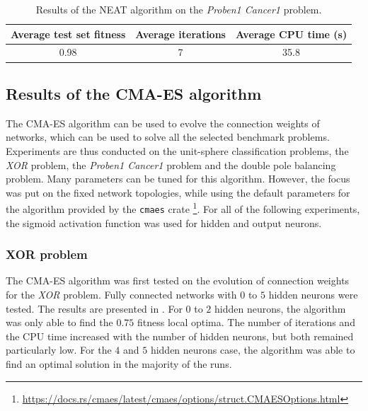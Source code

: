 
\begin{table}
    \caption{Results of the NEAT algorithm on the \textit{Proben1 Cancer1} problem.}
    \centering
    \label{tab:neat_proben1}
    \begin{tabular}{ |c|c|c| }
        \hline
        Average test set fitness & Average iterations & Average CPU time (s) \\
        \hline
        0.98 & 7 & 35.8 \\
        \hline\hline
    \end{tabular}
\end{table}

\subsection{Results of the CMA-ES algorithm}

The CMA-ES algorithm can be used to evolve the connection weights of networks, which can be used to solve all the selected benchmark problems. Experiments are thus conducted on the unit-sphere
classification problems, the \textit{XOR} problem, the \textit{Proben1 Cancer1} problem and the double pole balancing problem. Many parameters can be tuned for this algorithm.
However, the focus was put on the fixed network topologies, while using the default parameters for the algorithm provided by the \texttt{cmaes}
crate \footnote{\url{https://docs.rs/cmaes/latest/cmaes/options/struct.CMAESOptions.html}}. For all of the following experiments, the sigmoid activation function was used for hidden
and output neurons.

\subsubsection{XOR problem}

The CMA-ES algorithm was first tested on the evolution of connection weights for the \textit{XOR} problem.
Fully connected networks with $0$ to $5$ hidden neurons were tested. The results are presented in .
For $0$ to $2$ hidden neurons, the algorithm was only able to find the $0.75$ fitness local optima. The number of iterations and the CPU time increased with the number of hidden neurons,
but both remained particularly low. For the $4$ and $5$ hidden neurons case, the algorithm was able to find an optimal solution in the majority of the runs.

